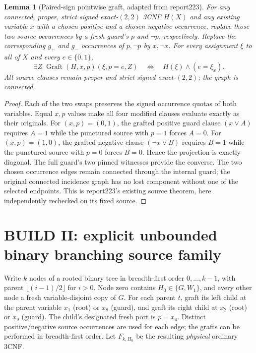 \documentclass[11pt]{article}
\newtheorem{lemma}[theorem]{Lemma}
\begin{document}
\begin{lemma}[Paired-sign pointwise graft, adapted from report223]\label{lem:graft}
For any connected, proper, strict signed exact-$(2,2)$ 3CNF $H(X)$ and any existing variable $x$ with a chosen positive and a chosen negative occurrence, replace those two source occurrences by a fresh guard's $p$ and $\neg p$, respectively. Replace the corresponding $g_+$ and $g_-$ occurrences of $p,\neg p$ by $x,\neg x$. For every assignment $\xi$ to \emph{all} of $X$ and every $e\in\{0,1\}$,
\[
\exists Z\;\operatorname{Graft}(H,x,p)(\xi,p=e,Z)\quad\Longleftrightarrow\quad H(\xi)\land(e=\xi_x).
\]
All source clauses remain proper and strict signed exact-$(2,2)$; the graph is connected.
\end{lemma}
\begin{proof}
Each of the two swaps preserves the signed occurrence quotas of both variables. Equal $x,p$ values make all four modified clauses evaluate exactly as their originals. For $(x,p)=(0,1)$, the grafted positive guard clause $(x\vee A)$ requires $A=1$ while the punctured source with $p=1$ forces $A=0$. For $(x,p)=(1,0)$, the grafted negative clause $(\neg x\vee B)$ requires $B=1$ while the punctured source with $p=0$ forces $B=0$. Hence the projection is exactly diagonal. The full guard's two pinned witnesses provide the converse. The two chosen occurrence edges remain connected through the internal guard; the original connected incidence graph has no lost component without one of the selected endpoints. This is report223's existing source theorem, here independently rechecked on its fixed source.
\end{proof}

\section{BUILD II: explicit unbounded binary branching source family}
Write $k$ nodes of a rooted binary tree in breadth-first order $0,\ldots,k-1$, with parent $\lfloor(i-1)/2\rfloor$ for $i>0$. Node zero contains $H_0\in\{G,W_1\}$, and every other node a fresh variable-disjoint copy of $G$. For each parent $t$, graft its left child at the parent variable $x_1$ (root) or $x_8$ (guard), and graft its right child at $x_2$ (root) or $x_9$ (guard). The child's designated fresh port is $p=x_4$. Distinct positive/negative source occurrences are used for each edge; the grafts can be performed in breadth-first order. Let $F_{k,H_0}$ be the resulting \emph{physical} ordinary 3CNF.
\end{document}
